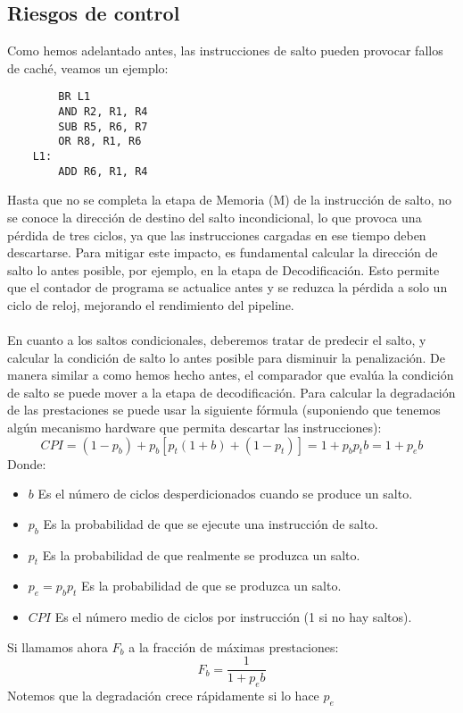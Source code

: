 \subsection{Riesgos de control}
Como hemos adelantado antes, las instrucciones de salto pueden provocar fallos de caché, veamos un ejemplo:
\begin{center}
    \begin{verbatim}
        BR L1 
        AND R2, R1, R4
        SUB R5, R6, R7
        OR R8, R1, R6
    L1: 
        ADD R6, R1, R4
    \end{verbatim}
\end{center}
Hasta que no se completa la etapa de Memoria (M) de la instrucción de salto, no se conoce la dirección de 
destino del salto incondicional, lo que provoca una pérdida de tres ciclos, ya que las instrucciones cargadas en ese tiempo deben descartarse.
Para mitigar este impacto, es fundamental calcular la dirección de salto lo antes posible, por ejemplo, en la etapa de Decodificación. Esto permite 
que el contador de programa se actualice antes y se reduzca la pérdida a solo un ciclo de reloj, mejorando el rendimiento del pipeline.
\\ \\
En cuanto a los saltos condicionales, deberemos tratar de predecir el salto, y calcular la condición de salto lo antes posible para disminuir la penalización.
De manera similar a como hemos hecho antes, el comparador que evalúa la condición de salto se puede mover  a la etapa de decodificación. Para calcular la degradación 
de las prestaciones se puede usar la siguiente fórmula (suponiendo que tenemos algún mecanismo hardware que permita descartar las instrucciones):
\begin{equation*}
    CPI = (1 - p_b) + p_b [ p_t (1 + b) + (1 - p_t) ] = 1 + p_b p_t b = 1 + p_e b
\end{equation*}
Donde:
\begin{itemize}
    \item $b$ Es el número de ciclos desperdicionados cuando se produce un salto.
    \item $p_b$ Es la probabilidad de que se ejecute una instrucción de salto.
    \item $p_t$ Es la probabilidad de que realmente se produzca un salto.
    \item $p_e = p_b p_t$ Es la probabilidad de que se produzca un salto.
    \item $CPI$ Es el número medio de ciclos por instrucción (1 si no hay saltos).
\end{itemize}
Si llamamos ahora $F_b$ a la fracción de máximas prestaciones:
\begin{equation*}
    F_b = \frac{1}{1 + p_e b}
\end{equation*}
Notemos que la degradación crece rápidamente si lo hace $p_e$

